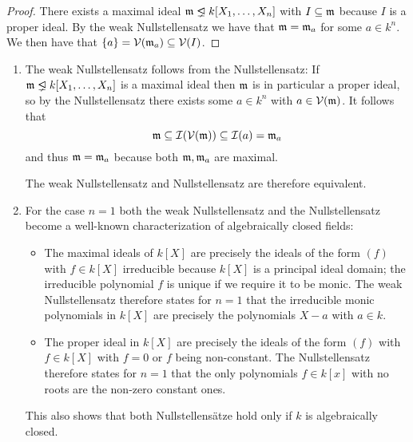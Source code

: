 \begin{proof}
  There exists a maximal ideal $\mf{m} \ideallneq k[X_1, \dotsc, X_n]$ with $I \subseteq \mathfrak{m}$ because $I$ is a proper ideal.
  By the weak Nullstellensatz we have that $\mathfrak{m} = \mathfrak{m}_a$ for some $a \in k^n$.
  We then have that $\{a\} = \mathcal{V}(\mathfrak{m}_a) \subseteq \mathcal{V}(I)$.
\end{proof}


\begin{remark}
  \label{remark: (weak) nullstellensatz}
  \leavevmode
  \begin{enumerate}
    \item
      \label{enumerate: WNS follows from NS}
      The weak Nullstellensatz follows from the Nullstellensatz:
      If $\mf{m} \ideallneq k[X_1, \dotsc, X_n]$ is a maximal ideal then $\mathfrak{m}$ is in particular a proper ideal, so by the Nullstellensatz there exists some $a \in k^n$ with $a \in \mathcal{V}(\mathfrak{m})$.
      It follows that
      \[
                  \mathfrak{m}
        \subseteq \mathcal{I}(\mathcal{V}(\mathfrak{m}))
        \subseteq \mathcal{I}(a)
        =         \mathfrak{m}_a
      \]
      and thus $\mathfrak{m} = \mathfrak{m}_a$ because both $\mathfrak{m}, \mathfrak{m}_a$ are maximal.
      
      The weak Nullstellensatz and Nullstellensatz are therefore equivalent.
    \item
      For the case $n = 1$ both the weak Nullstellensatz and the Nullstellensatz become a well-known characterization of algebraically closed fields:
      \begin{itemize}
        \item
          The maximal ideals of $k[X]$ are precisely the ideals of the form $(f)$ with $f \in k[X]$ irreducible because $k[X]$ is a principal ideal domain;
          the irreducible polynomial $f$ is unique if we require it to be monic.
          The weak Nullstellensatz therefore states for $n = 1$ that the irreducible monic polynomials in $k[X]$ are precisely the polynomials $X - a$ with $a \in k$.
        \item
          The proper ideal in $k[X]$ are precisely the ideals of the form $(f)$ with $f \in k[X]$ with $f = 0$ or $f$ being non-constant.
          The Nullstellensatz therefore states for $n = 1$ that the only polynomials $f \in k[x]$ with no roots are the non-zero constant ones.
      \end{itemize}
      This also shows that both Nullstellensätze hold only if $k$ is algebraically closed.
      

\end{enumerate}
\end{remark}
